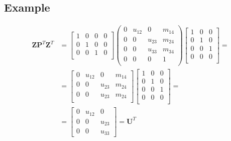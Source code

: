 \documentclass[\main/main.tex]{subfiles}
\begin{document}
\tocless\subsection{Example}\label{sec:examples}
\begin{equation}
\begin{split}
    \mathbf{Z} \mathbf{P}^T \mathbf{Z}^T &=
    \begin{bmatrix}
   1 & 0 & 0 & 0\\
    0 & 1 & 0 & 0\\
     0 & 0 & 1 & 0\\
    \end{bmatrix}
    \begin{pmatrix}
    0 &  u_{12} & 0 & m_{14}\\
    0 & 0 & u_{23} & m_{24}\\
    0 & 0 & u_{33} & m_{34}\\
    0 & 0 & 0 &1\\
    \end{pmatrix}
    \begin{bmatrix}
    1 & 0 & 0\\
    0 & 1& 0\\
    0 & 0 & 1\\
    0 & 0 & 0\\
    \end{bmatrix}
    = \\
    &= \begin{bmatrix}
    0 & u_{12} & 0 & m_{14}\\
    0 & 0 & u_{23} & m_{24}\\
    0 & 0 & u_{23} & m_{24}\\
    \end{bmatrix}
    \begin{bmatrix}
    1 & 0 & 0\\
    0 & 1& 0\\
    0 & 0 & 1\\
    0 & 0 & 0\\
    \end{bmatrix} = \\
    &= 
    \begin{bmatrix}
    0 & u_{12} & 0\\
    0 & 0 & u_{23}\\
    0 & 0 & u_{33}
    \end{bmatrix} =
    \mathbf{U}^T
    \end{split}
\end{equation}
\end{document}

